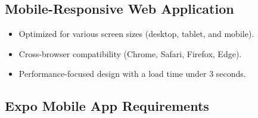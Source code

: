 \subsection{Mobile-Responsive Web Application}  
\begin{itemize}  
    \item Optimized for various screen sizes (desktop, tablet, and mobile).  
    \item Cross-browser compatibility (Chrome, Safari, Firefox, Edge).  
    \item Performance-focused design with a load time under 3 seconds.  
\end{itemize}  

\subsection{Expo Mobile App Requirements}  

